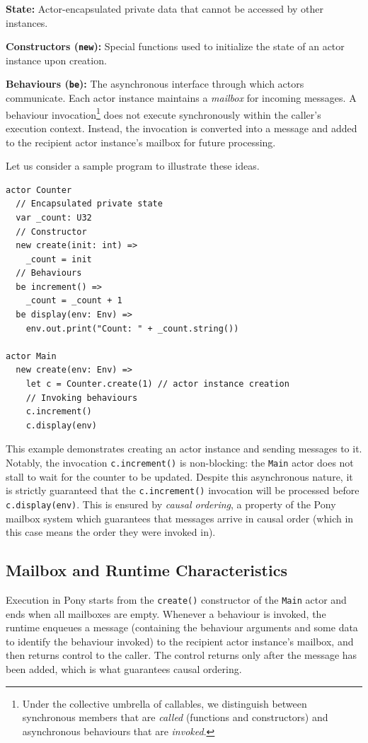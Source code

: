 \textbf{State:} Actor-encapsulated private data that cannot be accessed by other instances.

\textbf{Constructors (\texttt{new}):} Special functions used to initialize the state of an actor instance upon creation.

\textbf{Behaviours (\texttt{be}):} The asynchronous interface through which actors communicate. Each actor instance maintains a \textit{mailbox} for incoming messages. A behaviour invocation\footnote{Under the collective umbrella of callables, we distinguish between synchronous members that are \textit{called} (functions and constructors) and asynchronous behaviours that are \textit{invoked}.} does not execute synchronously within the caller's execution context. Instead, the invocation is converted into a message and added to the recipient actor instance's mailbox for future processing.

Let us consider a sample program to illustrate these ideas.

\begin{verbatim}
actor Counter
  // Encapsulated private state
  var _count: U32
  // Constructor
  new create(init: int) =>
    _count = init
  // Behaviours
  be increment() =>
    _count = _count + 1
  be display(env: Env) =>
    env.out.print("Count: " + _count.string())

actor Main
  new create(env: Env) =>
    let c = Counter.create(1) // actor instance creation
    // Invoking behaviours
    c.increment()
    c.display(env)
\end{verbatim}

This example demonstrates creating an actor instance and sending messages to it. Notably, the invocation \texttt{c.increment()} is non-blocking: the \texttt{Main} actor does not stall to wait for the counter to be updated. Despite this asynchronous nature, it is strictly guaranteed that the \texttt{c.increment()} invocation will be processed before \texttt{c.display(env)}. This is ensured by \textit{causal ordering}, a property of the Pony mailbox system which guarantees that messages arrive in causal order (which in this case means the order they were invoked in).

\subsection{Mailbox and Runtime Characteristics}
Execution in Pony starts from the \texttt{create()} constructor of the \texttt{Main} actor and ends when all mailboxes are empty. Whenever a behaviour is invoked, the runtime enqueues a message (containing the behaviour arguments and some data to identify the behaviour invoked) to the recipient actor instance's mailbox, and then returns control to the caller. The control returns only after the message has been added, which is what guarantees causal ordering. 

